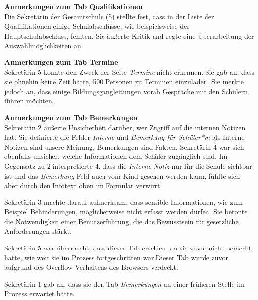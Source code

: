 \textbf{Anmerkungen zum Tab \glqq Qualifikationen\grqq{}}\\
Die Sekretärin der Gesamtschule (5) stellte fest, dass in der Liste der Qualifikationen einige Schulabschlüsse, wie beispielsweise der Hauptschulabschluss, fehlten. Sie äußerte Kritik und regte eine Überarbeitung der Auswahlmöglichkeiten an.

\textbf{Anmerkungen zum Tab \glqq Termine\grqq{}}\\
Sekretärin 5 konnte den Zweck der Seite \textit{Termine} nicht erkennen. Sie gab an, dass sie ohnehin keine Zeit hätte, 500 Personen zu Terminen einzuladen. Sie merkte jedoch an, dass einige Bildungsgangleitungen vorab Gespräche mit den Schülern führen möchten.

\textbf{Anmerkungen zum Tab \glqq Bemerkungen\grqq{}}\\
Sekretärin 2 äußerte Unsicherheit darüber, wer Zugriff auf die internen Notizen hat. Sie definierte die Felder \textit{Interne} und \textit{Bemerkung für Schüler*in} als \glqq Interne Notizen sind unsere Meinung, Bemerkungen sind Fakten\grqq{}. Sekretärin 4 war sich ebenfalls unsicher, welche Informationen dem Schüler zugänglich sind. Im Gegensatz zu 2 interpretierte 4, dass die \textit{Interne Notiz} nur für die Schule sichtbar ist und das \textit{Bemerkung}-Feld auch vom Kind gesehen werden kann, fühlte sich aber durch den Infotext oben im Formular verwirrt.

Sekretärin 3 machte darauf aufmerksam, dass sensible Informationen, wie zum Beispiel Behinderungen, möglicherweise nicht erfasst werden dürfen. Sie betonte die Notwendigkeit einer Benutzerführung, die das Bewusstsein für gesetzliche Anforderungen stärkt.

Sekretärin 5 war überrascht, dass dieser Tab erschien, da sie zuvor nicht bemerkt hatte, wie weit sie im Prozess fortgeschritten war.Dieser Tab wurde zuvor aufgrund des Overflow-Verhaltens des Browsers verdeckt.

Sekretärin 1 gab an, dass sie den Tab \textit{Bemerkungen} an einer früheren Stelle im Prozess erwartet hätte.

